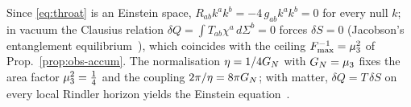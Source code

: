 \begin{theorem}\label{thm:obs-jacobson}
Since \eqref{eq:throat} is an Einstein space, $R_{ab}k^{a}k^{b}=-4\,g_{ab}k^{a}k^{b}=0$
for every null $k$; in vacuum the Clausius relation
$\delta Q=\int T_{ab}\chi^{a}\,d\Sigma^{b}=0$ forces $\delta S=0$ (Jacobson's
entanglement equilibrium~\cite{Jacobson1995}), which coincides with the ceiling
$F_{\max}^{-1}=\mu_{3}^{2}$ of Prop.~\ref{prop:obs-accum}. The normalisation
$\eta=1/4G_{N}$ with $G_{N}=\mu_{3}$ fixes the area factor $\mu_{3}^{2}=\tfrac14$
and the coupling $2\pi/\eta=8\pi G_{N}$; with matter, $\delta Q=T\,\delta S$ on every
local Rindler horizon yields the Einstein equation~\cite{Jacobson1995,Jacobson2016}.

\end{theorem}

